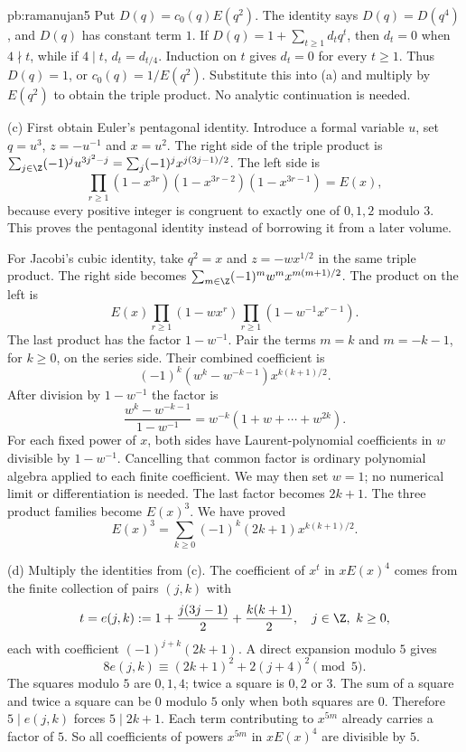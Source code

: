 \begin{solution}{pb:ramanujan5}
Put $D(q)=c_0(q)E(q^2)$.
The identity says $D(q)=D(q^4)$,
and $D(q)$ has constant term $1$.
If $D(q)=1+\sum_{t\ge1}d_tq^t$, then
$d_t=0$ when $4\nmid t$, while if $4\mid t$,
$d_t=d_{t/4}$. Induction on $t$ gives
$d_t=0$ for every $t\ge1$.
Thus $D(q)=1$, or $c_0(q)=1/E(q^2)$.
Substitute this into (a) and multiply by
$E(q^2)$ to obtain the triple product.
No analytic continuation is needed.

(c) First obtain Euler's pentagonal identity.
Introduce a formal variable $u$, set
$q=u^3$, $z=-u^{-1}$ and $x=u^2$.
The right side of the triple product is
$\sum_{j\in\Z}(-1)^ju^{3j^2-j}=
\sum_j(-1)^jx^{j(3j-1)/2}$.
The left side is
\[
\prod_{r\ge1}
(1-x^{3r})(1-x^{3r-2})(1-x^{3r-1})
=E(x),
\]
because every positive integer is congruent
to exactly one of $0,1,2$ modulo $3$.
This proves the pentagonal identity instead
of borrowing it from a later volume.

For Jacobi's cubic identity, take $q^2=x$
and $z=-wx^{1/2}$ in the same triple product.
The right side becomes
$\sum_{m\in\Z}(-1)^mw^mx^{m(m+1)/2}$.
The product on the left is
\[
E(x)\prod_{r\ge1}(1-wx^r)
\prod_{r\ge1}(1-w^{-1}x^{r-1}).
\]
The last product has the factor $1-w^{-1}$.
Pair the terms $m=k$ and $m=-k-1$,
for $k\ge0$, on the series side.
Their combined coefficient is
\[
(-1)^k(w^k-w^{-k-1})x^{k(k+1)/2}.
\]
After division by $1-w^{-1}$ the factor is
\[
\frac{w^k-w^{-k-1}}{1-w^{-1}}
=w^{-k}(1+w+\cdots+w^{2k}).
\]
For each fixed power of $x$, both sides have
Laurent-polynomial coefficients in $w$ divisible by
$1-w^{-1}$. Cancelling that common factor is ordinary
polynomial algebra applied to each finite coefficient.
We may then set $w=1$; no numerical limit
or differentiation is needed.
The last factor becomes $2k+1$.
The three product families become $E(x)^3$.
We have proved
\[
E(x)^3=\sum_{k\ge0}(-1)^k(2k+1)x^{k(k+1)/2}.
\]

(d) Multiply the identities from (c).
The coefficient of $x^t$ in $xE(x)^4$
comes from the finite collection of pairs $(j,k)$
with
\[
t=e(j,k):=1+\frac{j(3j-1)}2+\frac{k(k+1)}2,
\quad j\in\Z,\ k\ge0,
\]
each with coefficient $(-1)^{j+k}(2k+1)$.
A direct expansion modulo $5$ gives
\[
8e(j,k)\equiv(2k+1)^2+2(j+4)^2\pmod5.
\]
The squares modulo $5$ are $0,1,4$;
twice a square is $0,2$ or $3$.
The sum of a square and twice a square
can be $0$ modulo $5$ only when both
squares are $0$. Therefore
$5\mid e(j,k)$ forces $5\mid2k+1$.
Each term contributing to $x^{5m}$
already carries a factor of $5$.
So all coefficients of powers $x^{5m}$
in $xE(x)^4$ are divisible by $5$.


\end{solution}
